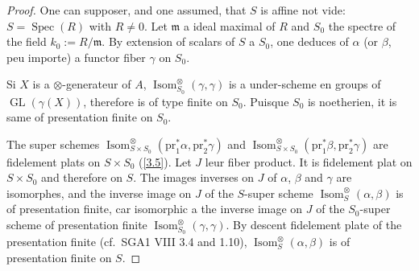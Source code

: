 \documentclass[11pt,a4paper]{article}
\theoremstyle{plain}
\theoremstyle{definition}
\DeclareMathOperator{\Spec}{Spec}
\DeclareMathOperator{\GL}{GL}
\newcommand{\pr}{\mathrm{pr}}
\newcommand{\Isom}{\operatorname{Isom}}
\begin{document}
\begin{proof}
One can supposer, and one assumed, that $S$ is affine not vide: $S=\Spec(R)$ with $R\neq0$. Let $\mathfrak{m}$ a ideal maximal of $R$ and $S_0$ the spectre of the field $k_0:=R/\mathfrak{m}$. By extension of scalars of $S$ a $S_0$, one deduces of $\alpha$ (or $\beta$, peu importe) a functor fiber $\gamma$ on $S_0$.

Si $X$ is a $\otimes$-generateur of $A$, $\Isom^\otimes_{S_0}(\gamma,\gamma)$ is a under-scheme en groups of $\GL(\gamma(X))$, therefore is of type finite on $S_0$. Puisque $S_0$ is noetherien, it is same of presentation finite on $S_0$.

The super schemes $\Isom^\otimes_{S\times S_0}(\pr_1^*\alpha,\pr_2^*\gamma)$ and $\Isom^\otimes_{S\times S_0}(\pr_1^*\beta,\pr_2^*\gamma)$ are fidelement plats on $S\times S_0$ (\ref{3.5}). Let $J$ leur fiber product. It is fidelement plat on $S\times S_0$ and therefore on $S$. The images inverses on $J$ of $\alpha$, $\beta$ and $\gamma$ are isomorphes, and the inverse image on $J$ of the $S$-super scheme $\Isom^\otimes_S(\alpha,\beta)$ is of presentation finite, car isomorphic a the inverse image on $J$ of the $S_0$-super scheme of presentation finite $\Isom^\otimes_{S_0}(\gamma,\gamma)$. By descent fidelement plate of the presentation finite (cf.~SGA1 VIII 3.4 and 1.10), $\Isom^\otimes_S(\alpha,\beta)$ is of presentation finite on $S$.
\end{proof}
\end{document}
